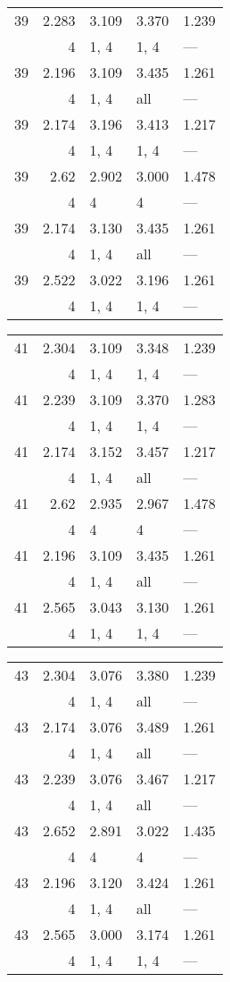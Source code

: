 \begin{tabular}{lrlll}
\toprule
 39 & 2.283 & 3.109 & 3.370 & 1.239 \\
    & 4     & 1, 4  & 1, 4  & ---   \\
 39 & 2.196 & 3.109 & 3.435 & 1.261 \\
    & 4     & 1, 4  & all   & ---   \\
 39 & 2.174 & 3.196 & 3.413 & 1.217 \\
    & 4     & 1, 4  & 1, 4  & ---   \\
 39 & 2.62  & 2.902 & 3.000 & 1.478 \\
    & 4     & 4     & 4     & ---   \\
 39 & 2.174 & 3.130 & 3.435 & 1.261 \\
    & 4     & 1, 4  & all   & ---   \\
 39 & 2.522 & 3.022 & 3.196 & 1.261 \\
    & 4     & 1, 4  & 1, 4  & ---   \\
\bottomrule
\end{tabular}
\begin{tabular}{lrlll}
\toprule
 41 & 2.304 & 3.109 & 3.348 & 1.239 \\
    & 4     & 1, 4  & 1, 4  & ---   \\
 41 & 2.239 & 3.109 & 3.370 & 1.283 \\
    & 4     & 1, 4  & 1, 4  & ---   \\
 41 & 2.174 & 3.152 & 3.457 & 1.217 \\
    & 4     & 1, 4  & all   & ---   \\
 41 & 2.62  & 2.935 & 2.967 & 1.478 \\
    & 4     & 4     & 4     & ---   \\
 41 & 2.196 & 3.109 & 3.435 & 1.261 \\
    & 4     & 1, 4  & all   & ---   \\
 41 & 2.565 & 3.043 & 3.130 & 1.261 \\
    & 4     & 1, 4  & 1, 4  & ---   \\
\bottomrule
\end{tabular}
\begin{tabular}{lrlll}
\toprule
 43 & 2.304 & 3.076 & 3.380 & 1.239 \\
    & 4     & 1, 4  & all   & ---   \\
 43 & 2.174 & 3.076 & 3.489 & 1.261 \\
    & 4     & 1, 4  & all   & ---   \\
 43 & 2.239 & 3.076 & 3.467 & 1.217 \\
    & 4     & 1, 4  & all   & ---   \\
 43 & 2.652 & 2.891 & 3.022 & 1.435 \\
    & 4     & 4     & 4     & ---   \\
 43 & 2.196 & 3.120 & 3.424 & 1.261 \\
    & 4     & 1, 4  & all   & ---   \\
 43 & 2.565 & 3.000 & 3.174 & 1.261 \\
    & 4     & 1, 4  & 1, 4  & ---   \\
\bottomrule
\end{tabular}
